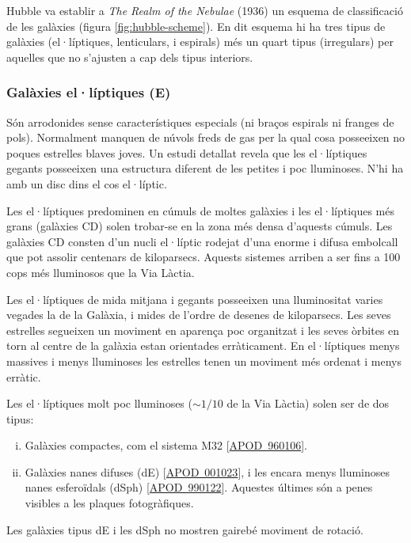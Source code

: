 Hubble va establir a \textit{The Realm of the Nebulae} (1936) un esquema de classificació de les galàxies (figura \ref{fig:hubble-scheme}). En dit esquema hi ha tres tipus de galàxies (el·líptiques, lenticulars, i espirals) més un quart tipus (irregulars) per aquelles que no s'ajusten a cap dels tipus interiors.

\subsubsection*{Galàxies el·líptiques (E)}
Són arrodonides sense característiques especials (ni braços espirals ni franges de pols). Normalment manquen de núvols freds de gas per la qual cosa posseeixen no poques estrelles blaves joves. Un estudi detallat revela que les el·líptiques gegants posseeixen una estructura diferent de les petites i poc lluminoses. N'hi ha amb un disc dins el cos el·líptic.

Les el·líptiques predominen en cúmuls de moltes galàxies i les el·líptiques més grans (galàxies CD) solen trobar-se en la zona més densa d'aquests cúmuls. Les galàxies CD consten d'un nucli el·líptic rodejat d'una enorme i difusa embolcall que pot assolir centenars de kiloparsecs. Aquests sistemes arriben a ser fins a 100 cops més lluminosos que la Via Làctia.

Les el·líptiques de mida mitjana i gegants posseeixen una lluminositat varies vegades la de la Galàxia, i mides de l'ordre de desenes de kiloparsecs. Les seves estrelles segueixen un moviment en aparença poc organitzat i les seves òrbites en torn al centre de la galàxia estan orientades erràticament. En el·líptiques menys massives i menys lluminoses les estrelles tenen un moviment més ordenat i menys erràtic.

Les el·líptiques molt poc lluminoses ($\sim 1/10$ de la Via Làctia) solen ser de dos tipus:
\begin{enumerate}[(i)]
	\item Galàxies compactes, com el sistema M32 [\href{http://apod.nasa.gov/apod/ap960106.html}{APOD~960106}].
	\item Galàxies nanes difuses (dE) [\href{http://apod.nasa.gov/apod/ap001023.html}{APOD~001023}], i les encara menys lluminoses nanes esferoïdals (dSph) [\href{http://apod.nasa.gov/apod/ap990122.html}{APOD~990122}]. Aquestes últimes són a penes visibles a les plaques fotogràfiques.
\end{enumerate}

Les galàxies tipus dE i les dSph no mostren gairebé moviment de rotació.

